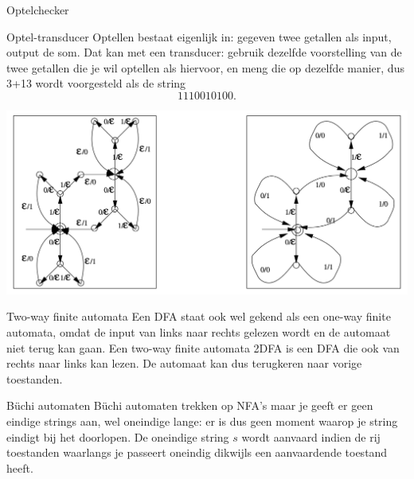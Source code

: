 \begin{theo}[Optelchecker]{Optelchecker}
\begin{minipage}{.21\textwidth}
    \end{minipage}
\end{theo}

\begin{theo}{Optel-transducer}
    Optellen bestaat eigenlijk in: gegeven twee getallen als input, output de som. Dat kan met een transducer: gebruik dezelfde voorstelling van de twee getallen die je wil optellen als hiervoor, 
    en meng die op dezelfde manier, dus 3+13 wordt voorgesteld als de string
    \begin{equation*}
        1110010100.
    \end{equation*}
    \begin{center}
        \hspace{0.25cm}\includegraphics[scale = 0.45]{Images/OptelTranducers.png}
    \end{center}
\end{theo}

\newpage

\begin{theo}{Two-way finite automata}
    Een DFA staat ook wel gekend als een one-way finite automata, omdat de input van links naar rechts gelezen wordt en de automaat niet terug kan gaan.
    Een two-way finite automata 2DFA is een DFA die ook van rechts naar links kan lezen. De automaat kan dus terugkeren naar vorige toestanden.
    \vspace{-0.05cm}
\end{theo}

\begin{theo}{Büchi automaten}
    Büchi automaten trekken op NFA's maar je geeft er geen eindige strings aan, wel oneindige lange: er is dus geen moment waarop je string eindigt bij het doorlopen.
    De oneindige string $s$ wordt aanvaard indien de rij toestanden waarlangs je passeert oneindig dikwijls een aanvaardende toestand heeft.
    \vspace{-0.05cm}
\end{theo}

